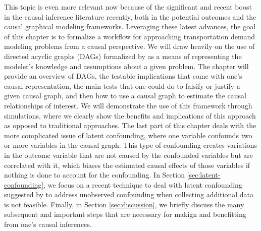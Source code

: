This topic is even more relevant now because of the significant and recent boost in the causal inference literature recently, both in the potential outcomes and the causal graphical modeling frameworks.
Leveraging these latest advances, the goal of this chapter is to formalize a workflow for approaching 
transportation demand modeling problems from a causal perspective. 
We will draw heavily on the use of directed acyclic graphs (DAGs) formalized by \citet{pearl_causality_2000} as a means of representing the modeler's knowledge and assumptions about a given problem. 
The chapter will provide an overview of DAGs, the 
testable implications that come with one's causal representation, the main 
tests that one could do to falsify or justify a given causal graph, and then how 
to use a causal graph to estimate the causal relationships of interest. 
We will demonstrate the use of this framework through simulations, where we 
clearly show the benefits and implications of this approach as opposed to 
traditional approaches. 
The last part of this chapter deals with the more complicated issue of latent 
confounding, where one variable confounds two or more variables in the causal 
graph. This type of confounding creates variations in the outcome variable that are not caused by 
the confounded variables but are correlated with it, which biases the estimated 
causal effects of those variables if nothing is done to account for the 
confounding. 
In Section \ref{sec:latent-confounding}, we focus on a recent technique to deal with latent confounding suggested by \citet{wang_2019_blessings} to address unobserved confounding when collecting additional data is not feasible. 
Finally, in Section \ref{sec:discussion}, we briefly discuss the many subsequent and important steps that are necessary for makign and benefitting from one's causal inferences.